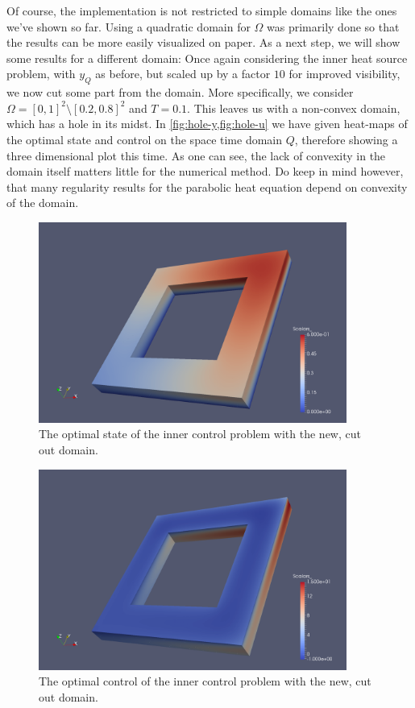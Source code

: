\documentclass[../thesis.tex]{subfiles}
\begin{document}
Of course, the implementation is not restricted to simple domains like the ones we've shown so far.
Using a quadratic domain for $\Omega$ was primarily done so that the results can be more easily visualized on paper.
As a next step, we will show some results for a different domain: Once again considering the inner heat source problem, with $y_Q$ as before, but scaled up by a factor $10$ for improved visibility, we now cut some part from the domain.
More specifically, we consider $\Omega = [0, 1]^2 \setminus [0.2, 0.8]^2$ and $T = 0.1$. This leaves us with a non-convex domain, which has a hole in its midst.
In \cref{fig:hole-y,fig:hole-u} we have given heat-maps of the optimal state and control on the space time domain $Q$, therefore showing a three dimensional plot this time.
As one can see, the lack of convexity in the domain itself matters little for the numerical method.
Do keep in mind however, that many regularity results for the parabolic heat equation depend on convexity of the domain.
\begin{figure}[htpb]
\centering
\includegraphics[width=0.9\textwidth]{Images/inner-hole-y.png}
\caption{The optimal state of the inner control problem with the new, cut out domain.}
\label{fig:hole-y}
\end{figure}
\begin{figure}[htpb]
\centering
\includegraphics[width=0.9\textwidth]{Images/inner-hole-u.png}
\caption{The optimal control of the inner control problem with the new, cut out domain.}
\label{fig:hole-u}
\end{figure}
\FloatBarrier
\end{document}
